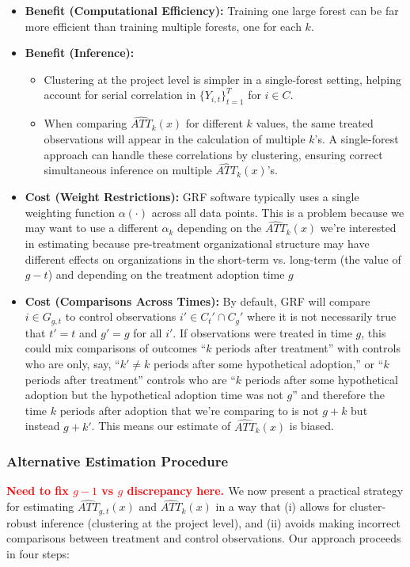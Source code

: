 \documentclass[source/paper/main.tex]{subfiles}
\begin{document}
\begin{itemize}
    \item \textbf{Benefit (Computational Efficiency):} Training one large forest can be far more efficient than training multiple forests, one for each $k$.
    \item \textbf{Benefit (Inference):}
    \begin{itemize}
      \item Clustering at the project level is simpler in a single-forest setting, helping account for serial correlation in $\{Y_{i,t}\}_{t=1}^T$ for $i \in C$.
      \item When comparing $\widehat{ATT}_{k}(x)$ for different $k$ values, the same treated observations will appear in the calculation of multiple $k$'s. A single-forest approach can handle these correlations by clustering, ensuring correct simultaneous inference on multiple $\widehat{ATT}_{k}(x)$'s. 
    \end{itemize}
    \item \textbf{Cost (Weight Restrictions):} GRF software typically uses a single weighting function $\alpha(\cdot)$ across all data points. This is a problem because we may want 
    to use a different $\alpha_k$ depending on the $\widehat{ATT}_{k}(x)$ we're interested in estimating because pre-treatment organizational structure may have different effects on organizations in the short-term vs. long-term (the value of $g-t$) and depending on the treatment adoption time $g$ 
    \item \textbf{Cost (Comparisons Across Times):} By default, GRF will compare $i \in G_{g,t}$ to control observations $i' \in C_t' \cap C_g'$ where it is not necessarily true that $t' = t$ and $g' = g$ for all $i'$. If observations were treated in time $g$, this could mix comparisons of outcomes ``$k$ periods after treatment'' with controls who are only, say, ``$k' \neq k$ periods after some hypothetical adoption,'' or ``$k$ periods after treatment'' controls who are ``$k$ periods after some hypothetical adoption but the hypothetical adoption time was not $g$'' and therefore the time $k$ periods after adoption that we're comparing to is not $g+k$ but instead $g+k'$. This means our estimate of $\widehat{ATT}_{k}(x)$ is biased. 
\end{itemize}

\subsubsection{Alternative Estimation Procedure}
\textbf{\textcolor{red}{Need to fix $g-1$ vs $g$ discrepancy here. }}
We now present a practical strategy for estimating $\widehat{ATT}_{g,t}(x)$ and $\widehat{ATT}_k(x)$ in a way that (i) allows for cluster‐robust inference (clustering at the project level), and (ii) avoids making incorrect comparisons between treatment and control observations. Our approach proceeds in four steps:
\end{document}
